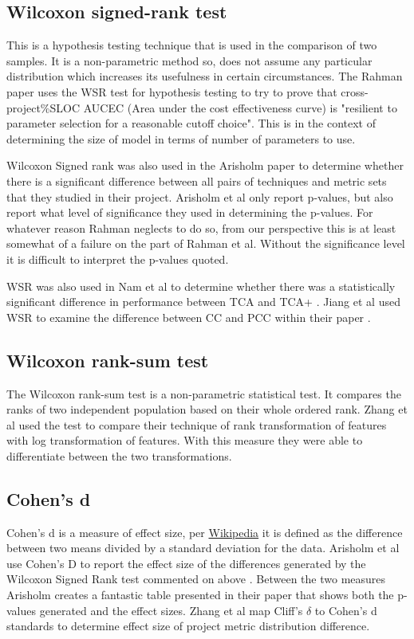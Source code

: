 \documentclass{sig-alternate-05-2015}
\begin{document}
\subsection{Wilcoxon signed-rank test}

This is a hypothesis testing technique that is used in the comparison of two samples.  It is a non-parametric method so, does not assume any particular distribution which increases its usefulness in certain circumstances.  The Rahman paper uses the WSR test for hypothesis testing to try to prove that cross-project\%SLOC AUCEC (Area under the cost effectiveness curve) is "resilient to parameter selection for a reasonable cutoff choice"\cite{Rahman}.  This is in the context of determining the size of model in terms of number of parameters to use.  

Wilcoxon Signed rank was also used in the Arisholm paper to determine whether there is a significant difference between all pairs of techniques and metric sets that they studied in their project\cite{Arisholm}.  Arisholm et al only report p-values, but also report what level of significance they used in determining the p-values.  For whatever reason Rahman neglects to do so, from our perspective this is at least somewhat of a failure on the part of Rahman et al.  Without the significance level it is difficult to interpret the p-values quoted.  

WSR was also used in Nam et al to determine whether there was a statistically significant difference in performance between TCA and TCA+ \cite{Nam}.  Jiang et al used WSR to examine the difference between CC and PCC within their paper \cite{Jiang}.

\subsection{Wilcoxon rank-sum test}
The Wilcoxon rank-sum test is a non-parametric statistical test. It compares the ranks of two independent population based on their whole ordered rank. Zhang et al \cite{Zhang2014} used the test to compare their technique of rank transformation of features with log transformation of features. With this measure they were able to differentiate between the two transformations. 

\subsection{Cohen's d}

Cohen's d is a measure of effect size, per \href{https://en.wikipedia.org/wiki/Effect_size#cite_note-CohenJ1988Statistical-7}{Wikipedia} it is defined as the difference between two means divided by a standard deviation for the data.  Arisholm et al use Cohen's D to report the effect size of the differences generated by the Wilcoxon Signed Rank test commented on above \cite{Arisholm}.  Between the two measures Arisholm creates a fantastic table presented in their paper that shows both the p-values generated and the effect sizes. Zhang et al \cite{Zhang2014} map Cliff's $\delta$ to Cohen's d standards to determine effect size of project metric distribution difference.
\end{document}
